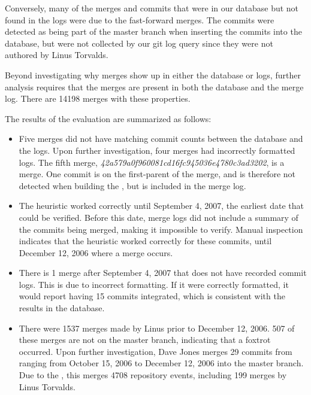 Conversely, many of the merges and commits that were in our database but
not found in the logs were due to the fast-forward merges. The commits
were detected as being part of the master branch when inserting the
commits into the database, but were not collected by our git log query
since they were not authored by Linus Torvalds.

Beyond investigating why merges show up in either the database or logs,
further analysis requires that the merges are present in both the
database and the merge log. There are 14198 merges with these
properties.

The results of the evaluation are summarized as follows:

\begin{itemize}
  \item

    Five merges did not have matching commit counts between the database
    and the logs. Upon further investigation, four merges had
    incorrectly formatted logs. The fifth merge,
    \emph{42a579a0f960081cd16fc945036e4780c3ad3202}, is a \foxtrot{}
    merge. One commit is on the first-parent of the merge, and is
    therefore not detected when building the \mt{}, but is included
    in the merge log.

  \item

    The heuristic worked correctly until September 4, 2007, the earliest
    date that could be verified. Before this date, merge logs did not
    include a summary of the commits being merged, making it impossible
    to verify. Manual inspection indicates that the heuristic worked
    correctly for these commits, until December 12, 2006 where a
    \foxtrot{} merge occurs.

  \item

    There is 1 merge after September 4, 2007 that does not have recorded
    commit logs. This is due to incorrect formatting. If it were
    correctly formatted, it would report having 15 commits integrated,
    which is consistent with the results in the database.

  \item

    There were 1537 merges made by Linus prior to December 12, 2006. 507
    of these merges are not on the master branch, indicating that a
    foxtrot occurred. Upon further investigation, Dave Jones merges
    29 commits from ranging from October 15, 2006 to December 12, 2006
    into the master branch. Due to the \foxtrot{}, this merges 4708
    repository events, including 199 merges by Linus Torvalds.


\end{itemize}
